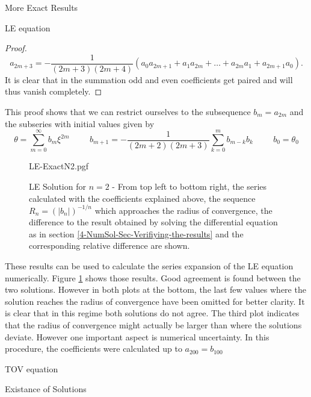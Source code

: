\begin{section}{More Exact Results}
\begin{subsection}{LE equation}
\begin{proof}
	\begin{equation}
		a_{2m+3} = -\frac{1}{(2m+3)(2m+4)}\left(a_0a_{2m+1}+a_1a_{2m}+\dots+a_{2m}a_1+a_{2m+1}a_0\right).
	\end{equation}
	It is clear that in the summation odd and even coefficients get paired and will thus vanish completely.
\end{proof}\noindent
This proof shows that we can restrict ourselves to the subsequence $b_m=a_{2m}$ and the subseries with initial values given by
\begin{equation}
	\theta = \sum\limits_{m=0}^\infty b_m\xi^{2m} \hspace{1cm} b_{m+1} = -\frac{1}{(2m+2)(2m+3)}\sum\limits_{k=0}^mb_{m-k}b_k \hspace{1cm} b_0=\theta_0
\end{equation}
\begin{figure}[H]
	{LE-ExactN2.pgf}
	\caption[LE Solution for $n=2$]{LE Solution for $n=2$ - From top left to bottom right, the series calculated with the coefficients explained above, the sequence $R_n=(|b_n|)^{-1/n}$ which approaches the radius of convergence, the difference to the result obtained by solving the differential equation as in section \ref{4-NumSol-Sec-Verifiying-the-results} and the corresponding relative difference are shown.}
	\label{5-MoExSo-LEN2-Plot}
\end{figure}\noindent
These results can be used to calculate the series expansion of the LE equation numerically. Figure \ref{5-MoExSo-LEN2-Plot} shows those results. Good agreement is found between the two solutions. However in both plots at the bottom, the last few values where the solution reaches the radius of convergence have been omitted for better clarity. It is clear that in this regime both solutions do not agree. The third plot indicates that the radius of convergence might actually be larger than where the solutions deviate. However one important aspect is numerical uncertainty. In this procedure, the coefficients were calculated up to $a_{200}=b_{100}$






\end{subsection}
%
%
\begin{subsection}{TOV equation}

\end{subsection}
%
%
\begin{subsection}{Existance of Solutions}

\end{subsection}
\end{section}
